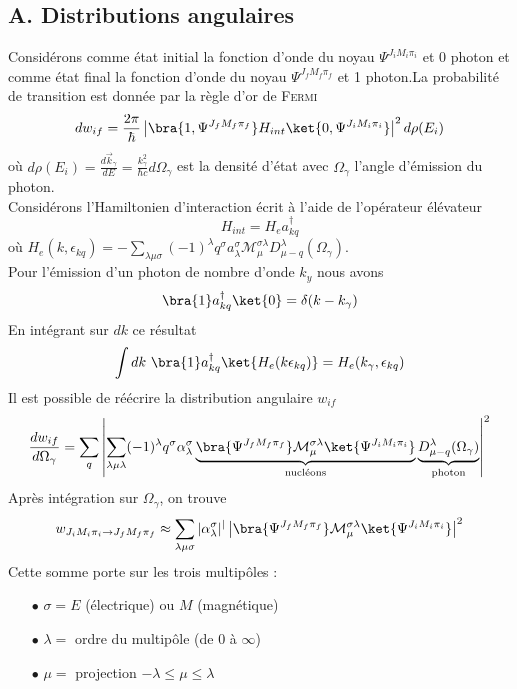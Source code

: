\subsection{A. Distributions angulaires}
Considérons comme état initial la fonction d'onde du noyau $\Psi^{J_iM_i\pi_i}$ et 0 photon et comme état final
la fonction d'onde du noyau $\Psi^{J_fM_f\pi_f}$ et 1 photon.La probabilité de transition est donnée par la
règle d'or de \textsc{Fermi}
\begin{equation}
dw_{if} = \frac{2\pi}{\hbar}\left|\bra{1,\Psi^{J_fM_f\pi_f}}H_{int}\ket{0,\Psi^{J_iM_i\pi_i}}\right|^2d\rho(E_i)
\end{equation}
où $d\rho(E_i)=\frac{d\vec k_\gamma}{dE}=\frac{k_\gamma^2}{\hbar c}d\Omega_\gamma$ est la densité d'état avec
$\Omega_\gamma$ l'angle d'émission du photon. \\

Considérons l'Hamiltonien d'interaction écrit à l'aide de l'opérateur élévateur
\begin{equation}
H_{int} = H_ea_{kq}^\dagger
\end{equation}
où $H_e(k,\epsilon_{kq}) = -\sum_{\lambda\mu\sigma}(-1)^\lambda q^\sigma a_\lambda^\sigma \mathcal{M}_\mu^{
\sigma\lambda}D_{\mu-q}^\lambda(\Omega_\gamma)$.\\

Pour l'émission d'un photon de nombre d'onde $k_y$ nous avons
\begin{equation}
\bra{1}a_{kq}^\dagger\ket{0} = \delta(k-k_\gamma)
\end{equation}
En intégrant sur $dk$ ce résultat
\begin{equation}
\int dk\ \bra{1}a_{kq}^\dagger\ket{H_e(k\epsilon_{kq})} = H_e(k_\gamma,\epsilon_{kq})
\end{equation}
Il est possible de réécrire la distribution angulaire $w_{if}$
\begin{equation}
\frac{dw_{if}}{d\Omega_\gamma} = \sum_q\left|\sum_{\lambda\mu\lambda}(-1)^\lambda q^\sigma\alpha_\lambda^\sigma
\underbrace{\bra{\Psi^{J_fM_f\pi_f}}\mathcal{M}_\mu^{\sigma\lambda}\ket{\Psi^{J_iM_i\pi_i}}}_{\text{nucléons}}
\underbrace{D_{\mu-q}^\lambda(\Omega_\gamma)}_{\text{photon}}\right|^2
\end{equation}
Après intégration sur $\Omega_\gamma$, on trouve
\begin{equation}
w_{J_iM_i\pi_i\to J_fM_f\pi_f} \approx \sum_{\lambda\mu\sigma} |\alpha_\lambda^\sigma|^|\left|
\bra{\Psi^{J_fM_f\pi_f}}\mathcal{M}_\mu^{\sigma\lambda}\ket{\Psi^{J_iM_i\pi_i}}\right|^2
\end{equation}
Cette somme porte sur les trois multipôles :
\begin{itemize}
\item[$\bullet$] $\sigma = E$ (électrique) ou $M$ (magnétique)
\item[$\bullet$] $\lambda=$ ordre du multipôle (de 0 à $\infty$)
\item[$\bullet$] $\mu =$ projection $-\lambda\leq \mu\leq\lambda$
\end{itemize}\ 


